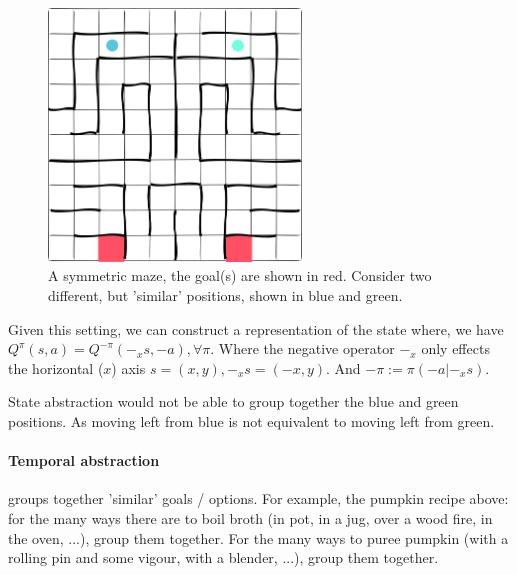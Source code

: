 \begin{figure}[h!]
\centering
\includegraphics[width=0.6\textwidth,height=0.3\textheight]{../../pictures/drawings/maze.png}
\caption{A symmetric maze, the goal(s) are shown in red.
Consider two different, but 'similar' positions, shown in blue and green.}
\end{figure}

Given this setting, we can construct a representation of the state \footnotemark[11] where,
we have $Q^{\pi}(s, a) = Q^{-\pi}(-_xs, -a), \forall \pi$.
Where the negative operator $-_x$ only effects the horizontal ($x$) axis $s = (x, y), -_xs = (-x, y)$.
And $-\pi := \pi(-a|-_xs)$. \footnotemark[21]



State abstraction would not be able to group together the blue and green positions.
As moving left from blue is not equivalent to moving left from green.

\paragraph{Temporal abstraction} groups together 'similar' goals / options.
For example, the pumpkin recipe above: for the many ways there are to boil broth
(in pot, in a jug, over a wood fire, in the oven, ...), group them together.
For the many ways to puree pumpkin (with a rolling pin and some vigour, with a blender, ...), group them together.

